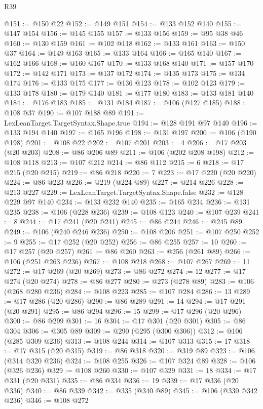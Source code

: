 \begin{lexlean}{R39}
\begin{coremodule}
@151 := @150 @22
@152 := @149 @151
@154 := @133 @152 @140
@155 := @147 @154
@156 := @145 @155
@157 := @133 @156
@159 := @95 @38 @46
@160 := @130 @159
@161 := @102 @118
@162 := @133 @161
@163 := @150 @37
@164 := @149 @163
@165 := @133 @164
@166 := @165 @140
@167 := @162 @166
@168 := @160 @167
@170 := @133 @168 @140
@171 := @157 @170
@172 := @142 @171
@173 := @137 @172
@174 := @135 @173
@175 := @134 @174
@176 := @133 @175
@177 := @136 @123
@178 := @102 @123
@179 := @133 @178
@180 := @179 @140
@181 := @177 @180
@183 := @133 @181 @140
@184 := @176 @183
@185 := @131 @184
@187 := @106 (@127 @185)
@188 := @108 @37
@190 := @107 @188 @89
@191 := LexLeanTarget.TargetSyntax.Shape.true
@194 := @128 @191 @97 @140
@196 := @133 @194 @140
@197 := @165 @196
@198 := @131 @197
@200 := @106 (@190 @198)
@201 := @108 @22
@202 := @107 @201
@203 := 4
@206 := @17 @203 (@20 @203)
@208 := @86 @206 @89
@211 := @106 (@202 @208 @198)
@212 := @108 @118
@213 := @107 @212
@214 := @86 @112
@215 := 6
@218 := @17 @215 (@20 @215)
@219 := @86 @218
@220 := 7
@223 := @17 @220 (@20 @220)
@224 := @86 @223
@226 := @219 (@224 @89)
@227 := @214 @226
@228 := @213 @227
@229 := LexLeanTarget.TargetSyntax.Shape.false
@232 := @128 @229 @97 @140
@234 := @133 @232 @140
@235 := @165 @234
@236 := @131 @235
@238 := @106 (@228 @236)
@239 := @108 @123
@240 := @107 @239
@241 := 8
@244 := @17 @241 (@20 @241)
@245 := @86 @244
@246 := @245 @89
@249 := @106 (@240 @246 @236)
@250 := @108 @206
@251 := @107 @250
@252 := 9
@255 := @17 @252 (@20 @252)
@256 := @86 @255
@257 := 10
@260 := @17 @257 (@20 @257)
@261 := @86 @260
@263 := @256 (@261 @89)
@266 := @106 (@251 @263 @236)
@267 := @108 @218
@268 := @107 @267
@269 := 11
@272 := @17 @269 (@20 @269)
@273 := @86 @272
@274 := 12
@277 := @17 @274 (@20 @274)
@278 := @86 @277
@280 := @273 (@278 @89)
@283 := @106 (@268 @280 @236)
@284 := @108 @223
@285 := @107 @284
@286 := 13
@289 := @17 @286 (@20 @286)
@290 := @86 @289
@291 := 14
@294 := @17 @291 (@20 @291)
@295 := @86 @294
@296 := 15
@299 := @17 @296 (@20 @296)
@300 := @86 @299
@301 := 16
@304 := @17 @301 (@20 @301)
@305 := @86 @304
@306 := @305 @89
@309 := @290 (@295 (@300 @306))
@312 := @106 (@285 @309 @236)
@313 := @108 @244
@314 := @107 @313
@315 := 17
@318 := @17 @315 (@20 @315)
@319 := @86 @318
@320 := @319 @89
@323 := @106 (@314 @320 @236)
@324 := @108 @255
@326 := @107 @324 @89
@328 := @106 (@326 @236)
@329 := @108 @260
@330 := @107 @329
@331 := 18
@334 := @17 @331 (@20 @331)
@335 := @86 @334
@336 := 19
@339 := @17 @336 (@20 @336)
@340 := @86 @339
@342 := @335 (@340 @89)
@345 := @106 (@330 @342 @236)
@346 := @108 @272

\end{coremodule}
\end{lexlean}
